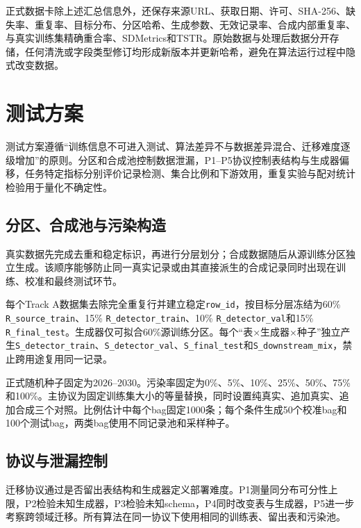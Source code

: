 \documentclass[
  chinese,
  12pt,
  a4paper,
  chinese,
  UTF8]{ctexart}
\begin{document}
正式数据卡除上述汇总信息外，还保存来源URL、获取日期、许可、SHA-256、缺失率、重复率、目标分布、分区哈希、生成参数、无效记录率、合成内部重复率、与真实训练集精确重合率、SDMetrics和TSTR。原始数据与处理后数据分开存储，任何清洗或字段类型修订均形成新版本并更新哈希，避免在算法运行过程中隐式改变数据。

\section{测试方案}\label{ux6d4bux8bd5ux65b9ux6848}

测试方案遵循``训练信息不可进入测试、算法差异不与数据差异混合、迁移难度逐级增加''的原则。分区和合成池控制数据泄漏，P1--P5协议控制表结构与生成器偏移，任务特定指标分别评价记录检测、集合比例和下游效用，重复实验与配对统计检验用于量化不确定性。

\subsection{分区、合成池与污染构造}\label{ux5206ux533aux5408ux6210ux6c60ux4e0eux6c61ux67d3ux6784ux9020}

真实数据先完成去重和稳定标识，再进行分层划分；合成数据随后从源训练分区独立生成。该顺序能够防止同一真实记录或由其直接派生的合成记录同时出现在训练、校准和最终测试环节。

每个Track
A数据集去除完全重复行并建立稳定\texttt{row\_id}，按目标分层冻结为60\%
\texttt{R\_source\_train}、15\% \texttt{R\_detector\_train}、10\%
\texttt{R\_detector\_val}和15\%
\texttt{R\_final\_test}。生成器仅可拟合60\%源训练分区。每个``表×生成器×种子''独立产生\texttt{S\_detector\_train}、\texttt{S\_detector\_val}、\texttt{S\_final\_test}和\texttt{S\_downstream\_mix}，禁止跨用途复用同一记录。

正式随机种子固定为2026--2030。污染率固定为0\%、5\%、10\%、25\%、50\%、75\%和100\%。主协议为固定训练集大小的等量替换，同时设置纯真实、追加真实、追加合成三个对照。比例估计中每个bag固定1000条；每个条件生成50个校准bag和100个测试bag，两类bag使用不同记录池和采样种子。

\subsection{协议与泄漏控制}\label{ux534fux8baeux4e0eux6cc4ux6f0fux63a7ux5236}

迁移协议通过是否留出表结构和生成器定义部署难度。P1测量同分布可分性上限，P2检验未知生成器，P3检验未知schema，P4同时改变表与生成器，P5进一步考察跨领域迁移。所有算法在同一协议下使用相同的训练表、留出表和污染池。
\end{document}
